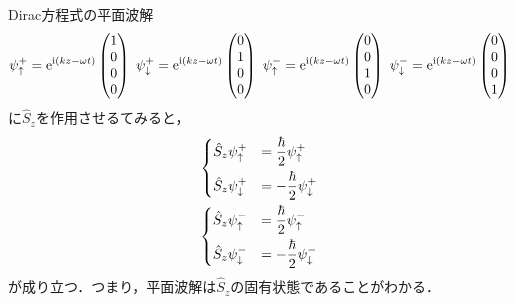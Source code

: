 \documentclass{report}
\begin{document}
  Dirac方程式の平面波解
  \begin{align}
    \psi_{\uparrow}^{+}
    =
    \e^{\i(kz-\omega t)}
    \begin{pmatrix}
      1\\0\\0\\0
    \end{pmatrix}\ 
    \psi_{\downarrow}^{+}
    =
    \e^{\i(kz-\omega t)}
    \begin{pmatrix}
      0\\1\\0\\0
    \end{pmatrix}\ 
    \psi_{\uparrow}^{-}
    =
    \e^{\i(kz-\omega t)}
    \begin{pmatrix}
      0\\0\\1\\0
    \end{pmatrix}\ 
    \psi_{\downarrow}^{-}
    =
    \e^{\i(kz-\omega t)}
    \begin{pmatrix}
      0\\0\\0\\1
    \end{pmatrix}
  \end{align}
  に$\hat{S}_z$を作用させるてみると，
  \begin{align}
    \begin{dcases}
      \hat{S}_z \psi^{+}_{\uparrow} &= \frac{\hbar}{2}\psi^{+}_{\uparrow}\\
      \hat{S}_z \psi^{+}_{\downarrow} &= -\frac{\hbar}{2}\psi^{+}_{\downarrow}
    \end{dcases}\\
    \begin{dcases}
      \hat{S}_z \psi^{-}_{\uparrow} &= \frac{\hbar}{2}\psi^{-}_{\uparrow}\\
      \hat{S}_z \psi^{-}_{\downarrow} &= -\frac{\hbar}{2}\psi^{-}_{\downarrow}
    \end{dcases}
  \end{align}
  が成り立つ．つまり，平面波解は$\hat{S}_z$の固有状態であることがわかる．
\end{document}
